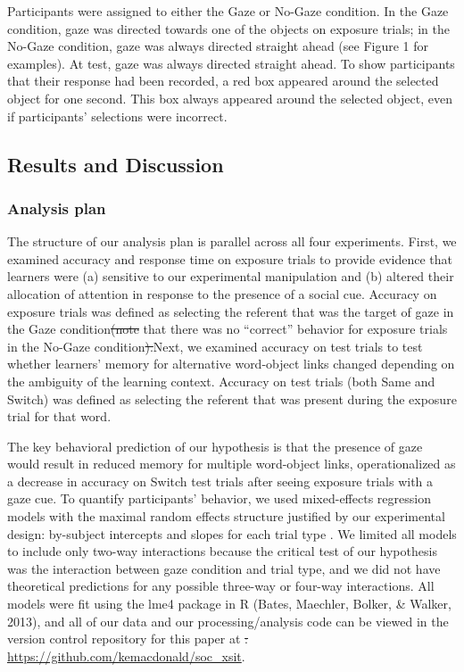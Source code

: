 \documentclass[authoryear, review]{elsarticle}
\providecommand{\DIFaddtex}[1]{{\protect\color{blue}\uwave{#1}}} %
\providecommand{\DIFdeltex}[1]{{\protect\color{red}\sout{#1}}}                      %
\providecommand{\DIFaddbegin}{} %
\providecommand{\DIFaddend}{} %
\providecommand{\DIFdelbegin}{} %
\providecommand{\DIFdelend}{} %
\providecommand{\DIFadd}[1]{\texorpdfstring{\DIFaddtex{#1}}{#1}} %
\providecommand{\DIFdel}[1]{\texorpdfstring{\DIFdeltex{#1}}{}} %
\begin{document}
Participants were assigned to either the Gaze or No-Gaze condition. In
the Gaze condition, gaze was directed towards one of the objects on
exposure trials; in the No-Gaze condition, gaze was always directed
straight ahead (see Figure 1 for examples). At test, gaze was always
directed straight ahead. To show participants that their response had
been recorded, a red box appeared around the selected object for one
second. This box always appeared around the selected object, even if
participants' selections were incorrect.

\subsection{Results and Discussion}\label{results-and-discussion}

\subsubsection{Analysis plan}\label{analysis-plan}

The structure of our analysis plan is parallel across all four
experiments. First, we examined accuracy and response time on exposure
trials to provide evidence that learners were (a) sensitive to our
experimental manipulation and (b) altered their allocation of attention
in response to the presence of a social cue. Accuracy on exposure trials
was defined as selecting the referent that was the target of gaze in the
Gaze condition\DIFdelbegin \DIFdel{(note }\DIFdelend \DIFaddbegin \DIFadd{. (Note }\DIFaddend that there was no ``correct'' behavior for
exposure trials in the No-Gaze condition\DIFdelbegin \DIFdel{).}\DIFdelend \DIFaddbegin \DIFadd{.) }\DIFaddend Next, we examined accuracy on
test trials to test whether learners' memory for alternative word-object
links changed depending on the ambiguity of the learning context.
Accuracy on test trials (both Same and Switch) was defined as selecting
the referent that was present during the exposure trial for that word.

The key behavioral prediction of our hypothesis is that the presence of
gaze would result in reduced memory for multiple word-object links,
operationalized as a decrease in accuracy on Switch test trials after
seeing exposure trials with a gaze cue. To quantify participants'
behavior, we used mixed-effects regression models with the maximal
random effects structure justified by our experimental design:
by-subject intercepts and slopes for each trial type \DIFaddbegin \DIFadd{(Barr, 2013)}\DIFaddend . We
limited all models to include only two-way interactions because the
critical test of our hypothesis was the interaction between gaze
condition and trial type, and we did not have theoretical predictions
for any possible three-way or four-way interactions. All models were fit
using the lme4 package in R (Bates, Maechler, Bolker, \& Walker, 2013),
and all of our data and our processing/analysis code can be viewed in
the version control repository for this paper at
\DIFdelbegin \DIFdel{:
}\DIFdelend \url{https://github.com/kemacdonald/soc_xsit}.
\end{document}
